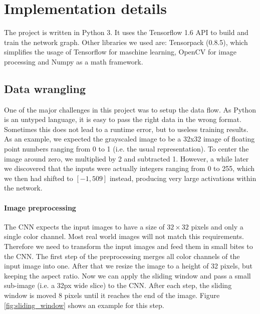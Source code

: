 \documentclass{utue} %
\begin{document}
\section{Implementation details}
The project is written in Python 3. It uses the Tensorflow 1.6 API to build and train the network graph. Other libraries we used are: Tensorpack (0.8.5), which simplifies the usage of Tensorflow for maschine learning, OpenCV for image processing and Numpy as a math framework.

\subsection{Data wrangling}
One of the major challenges in this project was to setup the data flow. As Python is an untyped language, it is easy to pass the right data in the wrong format. Sometimes this does not lead to a runtime error, but to useless training results. As an example, we expected the grayscaled image to be a 32x32 image of floating point numbers ranging from 0 to 1 (i.e. the usual representation). To center the image around zero, we multiplied by 2 and subtracted 1. However, a while later we discovered that the inputs were actually integers ranging from 0 to 255, which we then had shifted to $[-1, 509]$ instead, producing very large activations within the network.

\paragraph{Image preprocessing}
The CNN expects the input images to have a size of $32\times32$ pixels and only a single color channel. Most real world images will not match this requirements. Therefore we need to transform the input images and feed them in small bites to the CNN. The first step of the preprocessing merges all color channels of the input image into one. After that we resize the image to a height of 32 pixels, but keeping the aspect ratio. Now we can apply the sliding window and pass a small sub-image (i.e. a 32px wide slice) to the CNN. After each step, the sliding window is moved 8 pixels until it reaches the end of the image. Figure \ref{fig:sliding_window} shows an example for this step.
\end{document}
